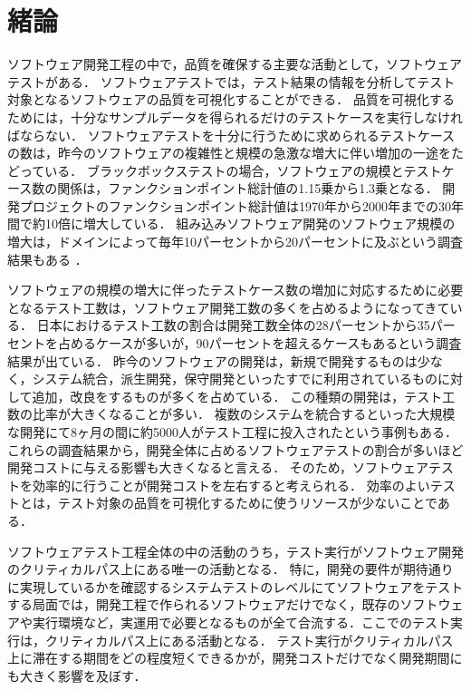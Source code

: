\chapter{緒論}
ソフトウェア開発工程の中で，品質を確保する主要な活動として，ソフトウェアテストがある．
ソフトウェアテストでは，テスト結果の情報を分析してテスト対象となるソフトウェアの品質を可視化することができる．
品質を可視化するためには，十分なサンプルデータを得られるだけのテストケースを実行しなければならない．
ソフトウェアテストを十分に行うために求められるテストケースの数は，昨今のソフトウェアの複雑性と規模の急激な増大に伴い増加の一途をたどっている．
ブラックボックステストの場合，ソフトウェアの規模とテストケース数の関係は，ファンクションポイント総計値の1.15乗から1.3乗となる\cite{jones1998estimating}．
開発プロジェクトのファンクションポイント総計値は1970年から2000年までの30年間で約10倍に増大している\cite{longstreet2000}．
組み込みソフトウェア開発のソフトウェア規模の増大は，ドメインによって毎年10パーセントから20パーセントに及ぶという調査結果もある \cite{jones2009}．

ソフトウェアの規模の増大に伴ったテストケース数の増加に対応するために必要となるテスト工数は，ソフトウェア開発工数の多くを占めるようになってきている．
日本におけるテスト工数の割合は開発工数全体の28パーセントから35パーセントを占めるケースが多いが，90パーセントを超えるケースもあるという調査結果が出ている\cite{IPA2015}．
昨今のソフトウェアの開発は，新規で開発するものは少なく，システム統合，派生開発，保守開発といったすでに利用されているものに対して追加，改良をするものが多くを占めている．
この種類の開発は，テスト工数の比率が大きくなることが多い．
複数のシステムを統合するといった大規模な開発にて8ヶ月の間に約5000人がテスト工程に投入されたという事例もある\cite{MTBUDay2}．
これらの調査結果から，開発全体に占めるソフトウェアテストの割合が多いほど開発コストに与える影響も大きくなると言える．
そのため，ソフトウェアテストを効率的に行うことが開発コストを左右すると考えられる．
効率のよいテストとは，テスト対象の品質を可視化するために使うリソースが少ないことである．

ソフトウェアテスト工程全体の中の活動のうち，テスト実行がソフトウェア開発のクリティカルパス上にある唯一の活動となる．
特に，開発の要件が期待通りに実現しているかを確認するシステムテストのレベルにてソフトウェアをテストする局面では，開発工程で作られるソフトウェアだけでなく，既存のソフトウェアや実行環境など，実運用で必要となるものが全て合流する．ここでのテスト実行は，クリティカルパス上にある活動となる．
テスト実行がクリティカルパス上に滞在する期間をどの程度短くできるかが，開発コストだけでなく開発期間にも大きく影響を及ぼす．

